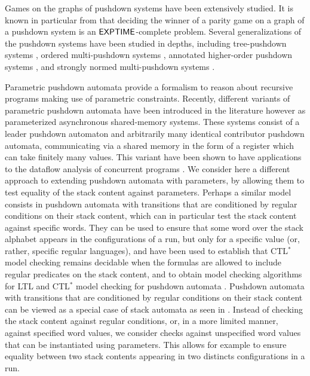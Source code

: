 \documentclass[a4paper,UKenglish,cleveref, autoref, thm-restate]{lipics-v2021}
\begin{document}
Games on the graphs of pushdown systems have been extensively studied.
It is known in particular from \cite{walukiewicz1996pushdown} that deciding the winner of a parity game on a graph of a pushdown system is an ${\sf EXPTIME}$-complete problem.
Several generalizations of the pushdown systems 
have been studied in depths, including
tree-pushdown systems \cite{guessarian1983pushdown}, ordered
multi-pushdown systems \cite{breveglieri1996multi, atig2012model}, annotated higher-order pushdown systems \cite{maslov1976multilevel, broadbent2012saturation}, and
strongly normed multi-pushdown systems \cite{czerwinski2012reachability}.




 Parametric pushdown automata provide a  formalism to
reason about 
recursive programs
making use of parametric constraints.
Recently, different variants of parametric pushdown automata have been introduced in the literature 
\cite{hague2011parameterised, esparza2016parameterized, fortin2017model} 
however as
parameterized asynchronous shared-memory systems.
These systems consist of a leader pushdown automaton
and arbitrarily many identical contributor pushdown automata, communicating via a shared memory
in the form of a register which can take finitely many values.
This variant have been shown to have applications
to the dataflow analysis of concurrent programs \cite{kahlon2008parameterization}. 
We consider here a different approach to extending pushdown automata with parameters, by allowing them to test equality of the stack content against parameters.
Perhaps a similar model consists in 
pushdown automata 
with transitions that are conditioned by regular conditions on their stack content, which
can in particular
test the
stack content against
specific words. 
They can be used to ensure that some word over the stack alphabet appears in the configurations of a run, but only for a specific value (or, rather, specific regular languages),
and have
been used to establish that CTL$^*$ model checking remains decidable
when the formulas are allowed to include regular predicates on the stack content,
and to obtain 
model checking algorithms for LTL and CTL$^*$ model checking
for
pushdown automata \cite{finkel1997direct}.
Pushdown automata 
with transitions that are conditioned by regular conditions on their stack content
can be viewed as
a special case of stack automata as seen in \cite{hopcroft1969formal}.
Instead
of checking the stack content against regular conditions, or, in a more limited manner,
against specified word values,
we consider
checks against unspecified word values that can be instantiated using parameters.
This allows for example to ensure equality between two stack contents appearing in two distincts configurations in a run.
\end{document}

